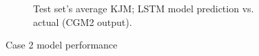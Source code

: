 \documentclass[../main.tex]{subfiles}
\begin{document}
\begin{figure}[ht!]
\begin{subfigure}[b]{0.515\textwidth}
         \label{fig:case2-prediction-performance}
         \caption{Test set's average \ac{KJM}; LSTM model prediction vs. actual (CGM2 output).}
     \end{subfigure}
    \caption{Case 2 model performance}
    \label{fig:case2-performance-plots}
\end{figure}

\end{document}
